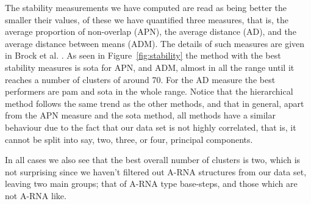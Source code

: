 The stability measurements  we have computed are read  as being better
the smaller their values, of  these we have quantified three measures,
that  is, the  average proportion  of non-overlap  (APN),  the average
distance (AD), and the average distance between means (ADM). The
details of  such measures are given  in Brock et al. \cite{brock2008}.
As  seen  in  Figure~\ref{fig:stability}  the  method  with  the  best
stability measures is  sota for APN, and ADM, almost  in all the range
until it reaches a number of clusters of around 70. For the AD measure
the best performers are pam and  sota in the whole range.  Notice that
the hierarchical method  follows the same trend as  the other methods,
and that in  general, apart from the APN measure  and the sota method,
all methods have a similar behaviour due to the fact that our data set
is not highly  correlated, that is, it cannot be  split into say, two,
three, or four, principal components.

In all cases  we also see that the best overall  number of clusters is
two, which is not surprising since we haven't filtered out A-RNA
structures from our  data set, leaving two main  groups; that of A-RNA
type base-steps, and those which are not A-RNA like.


